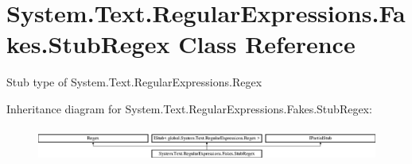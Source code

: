 \hypertarget{class_system_1_1_text_1_1_regular_expressions_1_1_fakes_1_1_stub_regex}{\section{System.\-Text.\-Regular\-Expressions.\-Fakes.\-Stub\-Regex Class Reference}
\label{class_system_1_1_text_1_1_regular_expressions_1_1_fakes_1_1_stub_regex}
}


Stub type of System.\-Text.\-Regular\-Expressions.\-Regex 


Inheritance diagram for System.\-Text.\-Regular\-Expressions.\-Fakes.\-Stub\-Regex\-:\begin{figure}[H]
\begin{center}
\leavevmode
\includegraphics[height=1.124498cm]{class_system_1_1_text_1_1_regular_expressions_1_1_fakes_1_1_stub_regex}
\end{center}
\end{figure}

